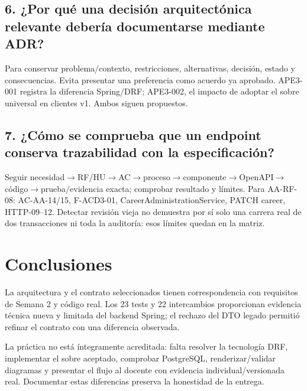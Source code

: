 \documentclass[11pt,a4paper]{article}
\begin{document}
\subsection{6. ¿Por qué una decisión arquitectónica relevante debería
documentarse mediante
ADR?}\label{informe-6-por-quuxe9-una-decisiuxf3n-arquitectuxf3nica-relevante-deberuxeda-documentarse-mediante-adr}

Para conservar problema/contexto, restricciones, alternativas, decisión,
estado y consecuencias. Evita presentar una preferencia como acuerdo ya
aprobado. APE3-001 registra la diferencia Spring/DRF; APE3-002, el
impacto de adoptar el sobre universal en clientes v1. Ambos siguen
propuestos.

\subsection{7. ¿Cómo se comprueba que un endpoint conserva trazabilidad
con la
especificación?}\label{informe-7-cuxf3mo-se-comprueba-que-un-endpoint-conserva-trazabilidad-con-la-especificaciuxf3n}

Seguir
necesidad\ensuremath{\rightarrow}RF/HU\ensuremath{\rightarrow}AC\ensuremath{\rightarrow}proceso\ensuremath{\rightarrow}componente\ensuremath{\rightarrow}OpenAPI\ensuremath{\rightarrow}código\ensuremath{\rightarrow}prueba/evidencia
exacta; comprobar resultado y límites. Para AA-RF-08: AC-AA-14/15,
F-ACD3-01, CareerAdministrationService, PATCH career, HTTP-09--12.
Detectar revisión vieja no demuestra por sí solo una carrera real de dos
transacciones ni toda la auditoría: esos límites quedan en la matriz.

\section{Conclusiones}\label{informe-conclusiones}

La arquitectura y el contrato seleccionados tienen correspondencia con
requisitos de Semana 2 y código real. Los 23 tests y 22 intercambios
proporcionan evidencia técnica nueva y limitada del backend Spring; el
rechazo del DTO legado permitió refinar el contrato con una diferencia
observada.

La práctica no está íntegramente acreditada: falta resolver la
tecnología DRF, implementar el sobre aceptado, comprobar PostgreSQL,
renderizar/validar diagramas y presentar el flujo al docente con
evidencia individual/versionada real. Documentar estas diferencias
preserva la honestidad de la entrega.
\end{document}
